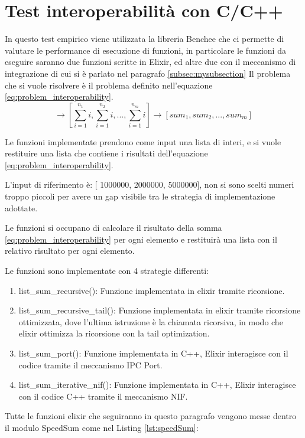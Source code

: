 \section{Test interoperabilità con C/C++}


In questo test empirico viene utilizzata la libreria Benchee
che ci permette di valutare le performance di esecuzione di
funzioni, in particolare le funzioni da eseguire saranno due funzioni
scritte in Elixir, ed altre due con il meccanismo di integrazione
di cui si è parlato nel paragrafo \ref{subsec:mysubsection}
Il problema che si vuole risolvere è il problema definito
nell'equazione \ref{eq:problem_interoperability}.
\begin{equation}
	[n_{1},n{_2}...n{_m}] \rightarrow [\sum_{i=1}^{n_{1}}i,\sum_{i=1}^{n_{2}}i,...,\sum_{i=1}^{n_{m}}i]
  \rightarrow [sum_{1},sum_{2},...,sum_{m}]
  \label{eq:problem_interoperability}
\end{equation}

Le funzioni implementate prendono come input una lista
di interi, e si vuole restituire una lista che contiene
i risultati dell'equazione \ref{eq:problem_interoperability}.

L'input di riferimento è: [ 1000000, 2000000, 5000000], non si
sono scelti numeri troppo piccoli per avere un gap visibile
tra le strategia di implementazione adottate.

Le funzioni si occupano di calcolare il risultato della somma
\ref{eq:problem_interoperability} per ogni elemento e
restituirà una lista con il relativo risultato per ogni elemento.

Le funzioni sono implementate con 4 strategie differenti:
\begin{enumerate}
	\item list\_sum\_recursive(): Funzione implementata in elixir
	tramite ricorsione.
	\item list\_sum\_recursive\_tail(): Funzione implementata in elixir
	tramite ricorsione ottimizzata, dove l'ultima istruzione è la
	chiamata ricorsiva, in modo che elixir ottimizza la ricorsione
	con la tail optimization.
	\item list\_sum\_port(): Funzione implementata in C++, Elixir interagisce
	con il codice tramite il meccanismo IPC Port.
	\item list\_sum\_iterative\_nif(): Funzione implementata in C++, Elixir
	interagisce con il codice C++ tramite il meccanismo NIF.
\end{enumerate}

Tutte le funzioni elixir che seguiranno in questo paragrafo
vengono messe dentro il modulo SpeedSum
come nel Listing \ref{lst:speedSum}:

